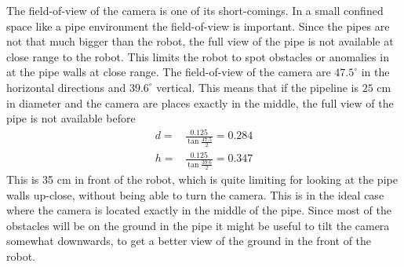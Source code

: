 The field-of-view of the camera is one of its short-comings. In a small confined space
like a pipe environment the field-of-view is important. Since the pipes are not that much
bigger than the robot, the full view of the pipe is not available at close range to the
robot. This limits the robot to spot obstacles or anomalies in at the pipe walls at close
range. The field-of-view of the camera are $47.5^\circ$ in the horizontal directions and
$39.6^\circ$ vertical. This means that if the pipeline is $25$ cm in diameter and the
camera are places exactly in the middle, the full view of the pipe is not available before
\begin{equation}
    \begin{aligned}
        d =& \frac{0.125}{ \tan \frac{47.5}{2}}  = 0.284\\
        h =& \frac{0.125}{\tan \frac{39.6}{2}} = 0.347
    \end{aligned}
\end{equation}
This is 35 cm in front of the robot, which is quite limiting for looking at the pipe walls
up-close, without being able to turn the camera. This is in the ideal case where the
camera is located exactly in
the middle of the pipe. Since most of the obstacles will be on the ground in the pipe it
might be useful to tilt the camera somewhat downwards, to get a better view of the ground
in the front of the robot. 






